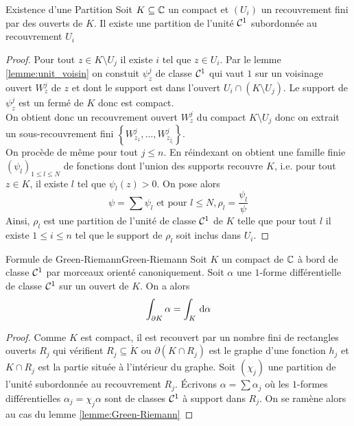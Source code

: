 \documentclass{cours}
\begin{document}
\begin{lemme}{Existence d'une Partition}{}
    Soit $K \subseteq \mathbb{C}$ un compact et $\left(U_{i}\right)$ un recouvrement fini par des ouverts de $K$. Il existe une partition de l'unité $\mathcal{C}^{1}$ subordonnée au recouvrement $U_{i}$
\end{lemme}
\begin{proof}
    Pour tout $z \in K \setminus U_{j}$ il existe $i$ tel que $z \in U_{i}$. Par le lemme \ref{lemme:unit_voisin} on constuit $\psi_{z}^{j}$ de classe $\mathcal{C}^{1}$ qui vaut $1$ sur un voisinage ouvert $W_{z}^{j}$ de $z$ et dont le support est dans l'ouvert $U_{i} \cap \left(K \setminus U_{j}\right)$. Le support de $\psi_{z}^{j}$ est un fermé de $K$ donc est compact. \\
    On obtient donc un recouvrement ouvert $W_{z}^{j}$ du compact $K \setminus U_{j}$ donc on extrait un sous-recouvrement fini $\left\{W_{z_{1}}^{j}, \ldots, W_{z_{j_{l}}}^{j}\right\}$. \\
    On procède de même pour tout $j \leq n$. En réindexant on obtient une famille finie $\left(\psi_{l}\right)_{1 \leq l \leq N}$ de fonctions dont l'union des supports recouvre $K$, i.e. pour tout $z \in K$, il existe $l$ tel que $\psi_{l}(z) > 0$. On pose alors 
    \[
        \psi = \sum \psi_{l} \text{ et pour } l\leq N, \rho_{l} = \frac{\psi_{l}}{\psi}
    \]
    Ainsi, $\rho_{l}$ est une partition de l'unité de classe $\mathcal{C}^{1}$ de $K$ telle que pour tout $l$ il existe $1 \leq i \leq n$ tel que le support de $\rho_{l}$ soit inclus dans $U_{i}$.
\end{proof}

\begin{théorème}{Formule de Green-Riemann}{Green-Riemann}
    Soit $K$ un compact de $\mathbb{C}$ à bord de classe $\mathcal{C}^{1}$ par morceaux orienté canoniquement. Soit $\alpha$ une $1$-forme différentielle de classe $\mathcal{C}^{1}$ sur un ouvert de $K$. On a alors 
    \[
        \int_{\partial K}\alpha = \int_{K}{\rm \, d} \alpha
    \]
\end{théorème}
\begin{proof}
    Comme $K$ est compact, il est recouvert par un nombre fini de rectangles ouverts $R_{j}$ qui vérifient $R_{j} \subseteq \mathring{K}$ ou $\partial\left(K \cap R_{j}\right)$ est le graphe d'une fonction $h_{j}$ et $K\cap R_{j}$ est la partie située à l'intérieur du graphe. Soit $\left(\chi_{j}\right)$ une partition de l'unité subordonnée au recouvrement $R_{j}$. Écrivons $\alpha = \sum \alpha_{j}$ où les $1$-formes différentielles $\alpha_{j} = \chi_{j}\alpha$ sont de classes $\mathcal{C}^{1}$ à support dans $R_{j}$. On se ramène alors au cas du lemme \ref{lemme:Green-Riemann}
\end{proof}
\end{document}
